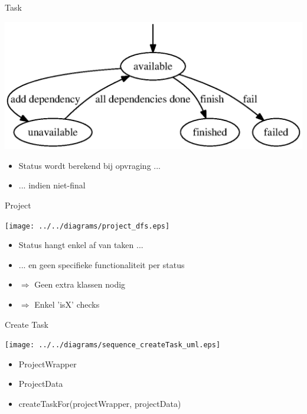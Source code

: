 \documentclass[mathserif,serif]{beamer}
\begin{document}
  \begin{frame}{Task}
      \begin{center}
      \includegraphics[width=\textwidth,height=0.5\textheight,keepaspectratio]{../../diagrams/task_dfs.eps}
        \begin{itemize}
        \item Status wordt berekend bij opvraging ...
        \item ... indien niet-final
        \end{itemize}
      \end{center}
  \end{frame}

  \begin{frame}{Project}
      \begin{center}
      \texttt{[image: ../../diagrams/project\_dfs.eps]}
        \begin{itemize}
        \item Status hangt enkel af van taken ...
        \item ... en geen specifieke functionaliteit per status
        \item $\Rightarrow$ Geen extra klassen nodig
        \item $\Rightarrow$ Enkel 'isX' checks
        \end{itemize}
      \end{center}
  \end{frame}

  \begin{frame}{Create Task}
      \begin{center}
      \texttt{[image: ../../diagrams/sequence\_createTask\_uml.eps]}
        \begin{itemize}
        \item ProjectWrapper
        \item ProjectData
        \item createTaskFor(projectWrapper, projectData)
        \end{itemize}
      \end{center}
  \end{frame}
\end{document}
